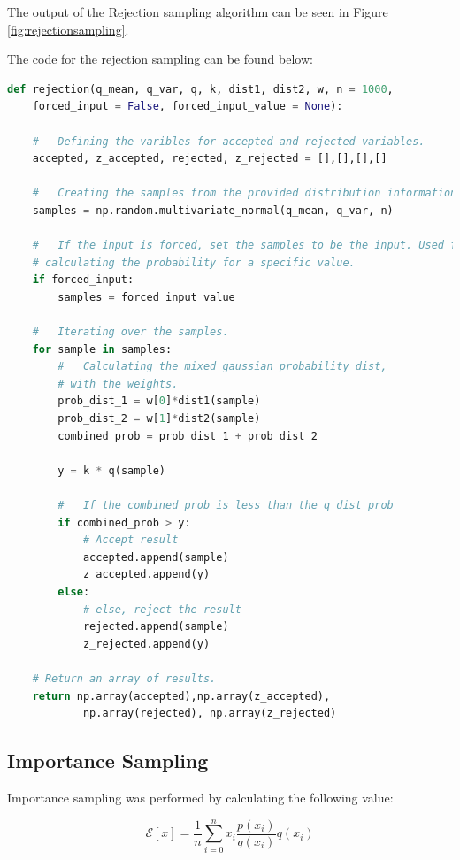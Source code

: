 \documentclass[a4paper, 11pt]{article}
\begin{document}
The output of the Rejection sampling algorithm can be seen in Figure \ref*{fig:rejectionsampling}.



The code for the rejection sampling can be found below:
\begin{lstlisting}[language=Python, caption=Rejection Sampling Code.]
def rejection(q_mean, q_var, q, k, dist1, dist2, w, n = 1000, 
    forced_input = False, forced_input_value = None):

    #   Defining the varibles for accepted and rejected variables.
    accepted, z_accepted, rejected, z_rejected = [],[],[],[] 

    #   Creating the samples from the provided distribution information.
    samples = np.random.multivariate_normal(q_mean, q_var, n)

    #   If the input is forced, set the samples to be the input. Used for 
    # calculating the probability for a specific value.
    if forced_input:
        samples = forced_input_value

    #   Iterating over the samples.
    for sample in samples:
        #   Calculating the mixed gaussian probability dist,
        # with the weights.
        prob_dist_1 = w[0]*dist1(sample)
        prob_dist_2 = w[1]*dist2(sample)
        combined_prob = prob_dist_1 + prob_dist_2
    
        y = k * q(sample)
    
        #   If the combined prob is less than the q dist prob
        if combined_prob > y:
            # Accept result
            accepted.append(sample)
            z_accepted.append(y)
        else:
            # else, reject the result
            rejected.append(sample)
            z_rejected.append(y)

    # Return an array of results.
    return np.array(accepted),np.array(z_accepted), 
            np.array(rejected), np.array(z_rejected)
\end{lstlisting}

\subsection{Importance Sampling}

Importance sampling was performed by calculating the following value:

\begin{equation}\label{eq:importance}
        \mathcal{E}[x] = \frac{1}{n} \sum_{i=0}^n x_i \frac{p(x_i)}{q(x_i)} q(x_i)
\end{equation}
\end{document}
